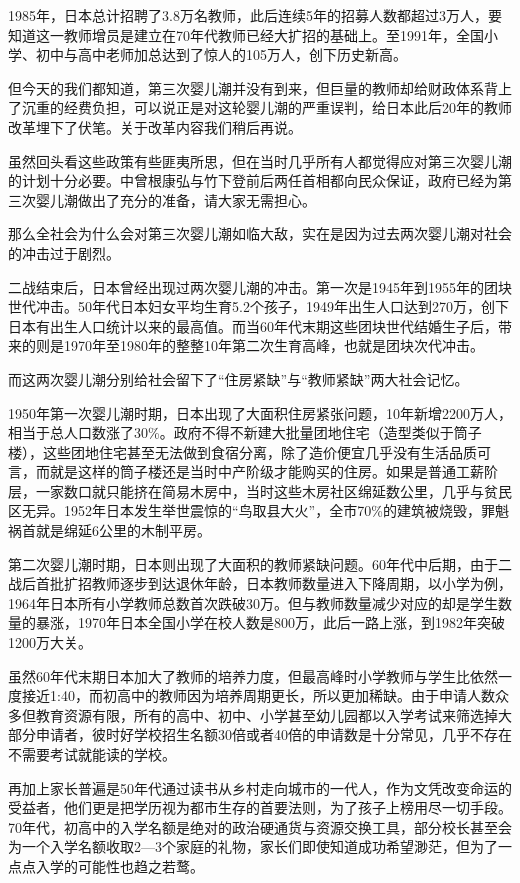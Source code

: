 1985年，日本总计招聘了3.8万名教师，此后连续5年的招募人数都超过3万人，要知道这一教师增员是建立在70年代教师已经大扩招的基础上。至1991年，全国小学、初中与高中老师加总达到了惊人的105万人，创下历史新高。

但今天的我们都知道，第三次婴儿潮并没有到来，但巨量的教师却给财政体系背上了沉重的经费负担，可以说正是对这轮婴儿潮的严重误判，给日本此后20年的教师改革埋下了伏笔。关于改革内容我们稍后再说。

虽然回头看这些政策有些匪夷所思，但在当时几乎所有人都觉得应对第三次婴儿潮的计划十分必要。中曾根康弘与竹下登前后两任首相都向民众保证，政府已经为第三次婴儿潮做出了充分的准备，请大家无需担心。

那么全社会为什么会对第三次婴儿潮如临大敌，实在是因为过去两次婴儿潮对社会的冲击过于剧烈。

二战结束后，日本曾经出现过两次婴儿潮的冲击。第一次是1945年到1955年的团块世代冲击。50年代日本妇女平均生育5.2个孩子，1949年出生人口达到270万，创下日本有出生人口统计以来的最高值。而当60年代末期这些团块世代结婚生子后，带来的则是1970年至1980年的整整10年第二次生育高峰，也就是团块次代冲击。

而这两次婴儿潮分别给社会留下了“住房紧缺”与“教师紧缺”两大社会记忆。

1950年第一次婴儿潮时期，日本出现了大面积住房紧张问题，10年新增2200万人，相当于总人口数涨了30\%。政府不得不新建大批量团地住宅（造型类似于筒子楼），这些团地住宅甚至无法做到食宿分离，除了造价便宜几乎没有生活品质可言，而就是这样的筒子楼还是当时中产阶级才能购买的住房。如果是普通工薪阶层，一家数口就只能挤在简易木房中，当时这些木房社区绵延数公里，几乎与贫民区无异。1952年日本发生举世震惊的“鸟取县大火”，全市70\%的建筑被烧毁，罪魁祸首就是绵延6公里的木制平房。

第二次婴儿潮时期，日本则出现了大面积的教师紧缺问题。60年代中后期，由于二战后首批扩招教师逐步到达退休年龄，日本教师数量进入下降周期，以小学为例，1964年日本所有小学教师总数首次跌破30万。但与教师数量减少对应的却是学生数量的暴涨，1970年日本全国小学在校人数是800万，此后一路上涨，到1982年突破1200万大关。

虽然60年代末期日本加大了教师的培养力度，但最高峰时小学教师与学生比依然一度接近1:40，而初高中的教师因为培养周期更长，所以更加稀缺。由于申请人数众多但教育资源有限，所有的高中、初中、小学甚至幼儿园都以入学考试来筛选掉大部分申请者，彼时好学校招生名额30倍或者40倍的申请数是十分常见，几乎不存在不需要考试就能读的学校。

再加上家长普遍是50年代通过读书从乡村走向城市的一代人，作为文凭改变命运的受益者，他们更是把学历视为都市生存的首要法则，为了孩子上榜用尽一切手段。70年代，初高中的入学名额是绝对的政治硬通货与资源交换工具，部分校长甚至会为一个入学名额收取2—3个家庭的礼物，家长们即使知道成功希望渺茫，但为了一点点入学的可能性也趋之若鹜。

